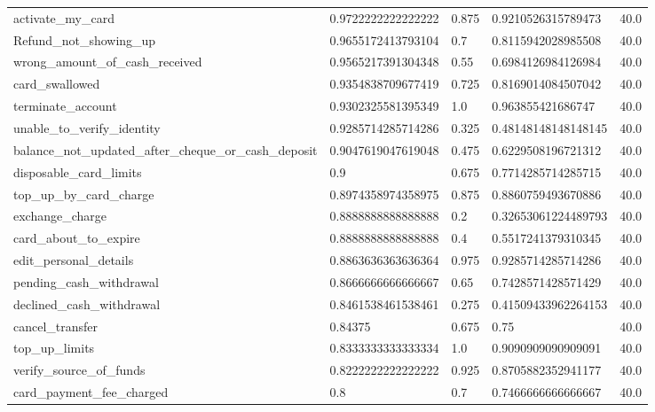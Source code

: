 \begin{table}[!ht]
\begin{tabularx}{\textwidth}{X l l l l}
activate\_my\_card & \num{0.9722222222222222} & \num{0.875} & \num{0.9210526315789473} & \num{40.0} \\
Refund\_not\_showing\_up & \num{0.9655172413793104} & \num{0.7} & \num{0.8115942028985508} & \num{40.0} \\
wrong\_amount\_of\_cash\_received & \num{0.9565217391304348} & \num{0.55} & \num{0.6984126984126984} & \num{40.0} \\
card\_swallowed & \num{0.9354838709677419} & \num{0.725} & \num{0.8169014084507042} & \num{40.0} \\
terminate\_account & \num{0.9302325581395349} & \num{1.0} & \num{0.963855421686747} & \num{40.0} \\
unable\_to\_verify\_identity & \num{0.9285714285714286} & \num{0.325} & \num{0.48148148148148145} & \num{40.0} \\
balance\_not\_updated\_after\_cheque\_or\_cash\_deposit & \num{0.9047619047619048} & \num{0.475} & \num{0.6229508196721312} & \num{40.0} \\
disposable\_card\_limits & \num{0.9} & \num{0.675} & \num{0.7714285714285715} & \num{40.0} \\
top\_up\_by\_card\_charge & \num{0.8974358974358975} & \num{0.875} & \num{0.8860759493670886} & \num{40.0} \\
exchange\_charge & \num{0.8888888888888888} & \num{0.2} & \num{0.32653061224489793} & \num{40.0} \\
card\_about\_to\_expire & \num{0.8888888888888888} & \num{0.4} & \num{0.5517241379310345} & \num{40.0} \\
edit\_personal\_details & \num{0.8863636363636364} & \num{0.975} & \num{0.9285714285714286} & \num{40.0} \\
pending\_cash\_withdrawal & \num{0.8666666666666667} & \num{0.65} & \num{0.7428571428571429} & \num{40.0} \\
declined\_cash\_withdrawal & \num{0.8461538461538461} & \num{0.275} & \num{0.41509433962264153} & \num{40.0} \\
cancel\_transfer & \num{0.84375} & \num{0.675} & \num{0.75} & \num{40.0} \\
top\_up\_limits & \num{0.8333333333333334} & \num{1.0} & \num{0.9090909090909091} & \num{40.0} \\
verify\_source\_of\_funds & \num{0.8222222222222222} & \num{0.925} & \num{0.8705882352941177} & \num{40.0} \\
card\_payment\_fee\_charged & \num{0.8} & \num{0.7} & \num{0.7466666666666667} & \num{40.0} \\

\end{tabularx}
\end{table}
